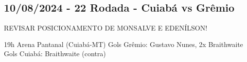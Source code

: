 \newpage
\subsection{10/08/2024 - 22 Rodada - Cuiabá vs Grêmio}

\begin{figure}[H]
    \centering
    
\end{figure}

REVISAR POSICIONAMENTO DE MONSALVE E EDENÍLSON!

19h 
Arena Pantanal (Cuiabá-MT)
Gols Grêmio: Gustavo Nunes, 2x Braithwaite
Gols Cuiabá: Braithwaite (contra)
